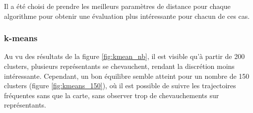 Il a été choisi de prendre les meilleurs paramètres de distance pour chaque algorithme pour obtenir une évaluation plus intéressante pour chacun de ces cas.

\subsubsection{k-means}

Au vu des résultats de la figure \ref{fig:kmean_nb}, il est visible qu'à partir de 200 clusters, plusieurs représentants se chevauchent, rendant la discrétion moins intéressante. Cependant, un bon équilibre semble atteint pour un nombre de 150 clusters (figure \ref{fig:kmeans_150}), où il est possible de suivre les trajectoires fréquentes sans que la carte, sans observer trop de chevauchements sur représentants.

